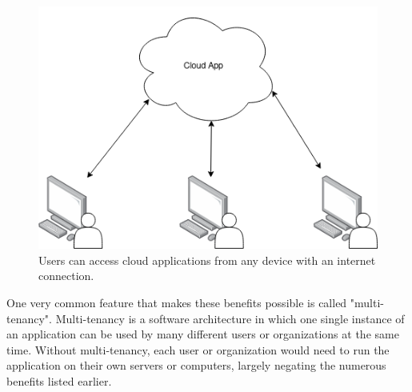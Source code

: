 \begin{figure}[H]
    \centering
    \includegraphics[scale=0.35]{images/basic-cloud-services.drawio.png}
    \caption{Users can access cloud applications from any device with an internet connection.}
    \label{fig:cloud-applications}
\end{figure}



One very common feature that makes these benefits possible is called "multi-tenancy".
Multi-tenancy is a software architecture in which one single instance of an application
can be used by many different users or organizations at the same time. 
Without multi-tenancy, each user or organization would need to run the application on
their own servers or computers, 
largely negating the numerous benefits listed earlier.

